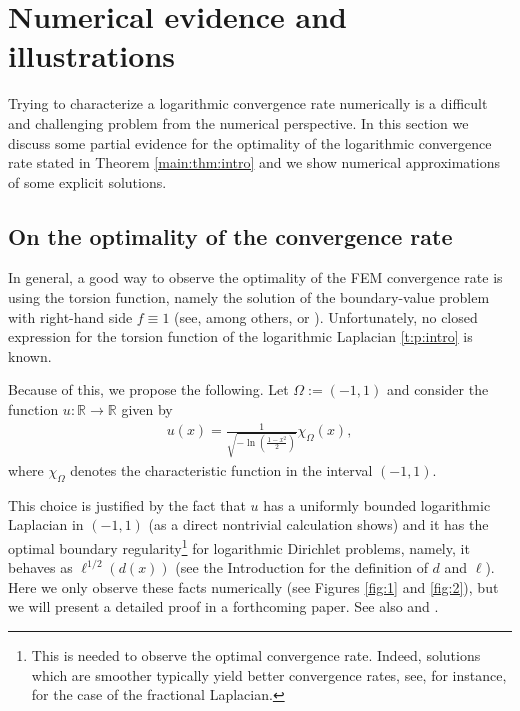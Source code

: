 \documentclass[11 pt]{article}
\numberwithin{equation}{section}
\def\R{\mathbb{R}}
\begin{document}
\section{Numerical evidence and illustrations}\label{sec:numerics}

Trying to characterize a logarithmic convergence rate numerically is a difficult and challenging problem from the numerical perspective. In this section we discuss some partial evidence for the optimality of the logarithmic convergence rate stated in Theorem \ref{main:thm:intro} and we show numerical approximations of some explicit solutions.  

\subsection{On the optimality of the convergence rate}

In general, a good way to observe the optimality of the FEM convergence rate is using the torsion function, namely the solution of the boundary-value problem with right-hand side $f\equiv 1$ (see, among others, \cite[Section 5]{AB17} or \cite[Section 5]{BHS19}). Unfortunately, no closed expression for the torsion function of the logarithmic Laplacian \eqref{t:p:intro} is known.

Because of this, we propose the following. Let $\Omega:=(-1,1)$ and consider the function $u:\R\to\R$ given by
\begin{align}\label{udef}
 u(x)=\frac{1}{\sqrt{-\ln\left(\frac{1-x^2}{2}\right)}} \chi_{\Omega}(x),
\end{align}
where $\chi_{\Omega}$ denotes the characteristic function in the interval $(-1,1)$.

This choice is justified by the fact that $u$ has a uniformly bounded logarithmic Laplacian in $(-1,1)$ (as a direct nontrivial calculation shows) and it has the optimal boundary regularity\footnote{This is needed to observe the optimal convergence rate. Indeed, solutions which are smoother typically yield better convergence rates, see, for instance, \cite[Section 5 and Table 2]{AB17} for the case of the fractional Laplacian.} for logarithmic Dirichlet problems, namely, it behaves as $\ell^{1/2}(d(x))$ (see the Introduction for the definition of $d$ and $\ell$). Here we only observe these facts numerically (see Figures \ref{fig:1} and \ref{fig:2}), but we will present a detailed proof in a forthcoming paper. See also \cite[Theorem 1.11]{CW19} and \cite[Remark~1.5]{FJW22}.
\end{document}
